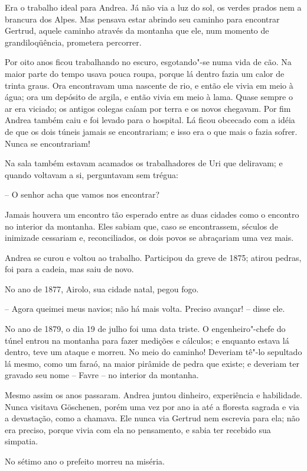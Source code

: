 Era o trabalho ideal para Andrea. Já não via a luz do sol, os verdes
prados nem a brancura dos Alpes. Mas pensava estar abrindo seu caminho
para encontrar Gertrud, aquele caminho através da montanha que ele, num
momento de grandiloqüência, prometera percorrer.

Por oito anos ficou trabalhando no escuro, esgotando"-se numa vida de
cão. Na maior parte do tempo usava pouca roupa, porque lá dentro fazia
um calor de trinta graus. Ora encontravam uma nascente de rio, e então
ele vivia em meio à água; ora um depósito de argila, e então vivia em
meio à lama. Quase sempre o ar era viciado; os antigos colegas caíam
por terra e os novos chegavam. Por fim Andrea também caiu e foi levado
para o hospital. Lá ficou obcecado com a idéia de que os dois túneis
jamais se encontrariam; e isso era o que mais o fazia sofrer. Nunca se
encontrariam!

Na sala também estavam acamados os trabalhadores de Uri que deliravam; e
quando voltavam a si, perguntavam sem trégua:

-- O senhor acha que vamos nos encontrar?

Jamais houvera um encontro tão esperado entre as duas cidades como o
encontro no interior da montanha. Eles sabiam que, caso se
encontrassem, séculos de inimizade cessariam e, reconciliados, os dois
povos se abraçariam uma vez mais.

Andrea se curou e voltou ao trabalho. Participou da greve de 1875;
atirou pedras, foi para a cadeia, mas saiu de novo.

No ano de 1877, Airolo, sua cidade natal, pegou fogo.

-- Agora queimei meus navios; não há mais volta. Preciso avançar! -- disse
ele.

No ano de 1879, o dia 19 de julho foi uma data triste. O
engenheiro"-chefe do túnel entrou na montanha para fazer medições e
cálculos; e enquanto estava lá dentro, teve um ataque e morreu. 
No meio do caminho! Deveriam tê"-lo sepultado lá mesmo, como
um faraó, na maior pirâmide de pedra que existe; e deveriam ter gravado
seu nome -- Favre -- no interior da montanha.

Mesmo assim os anos passaram. Andrea juntou dinheiro, experiência e
habilidade. Nunca visitava Göschenen, porém uma vez por ano ia até a
floresta sagrada e via a devastação, como a chamava. Ele nunca via
Gertrud nem escrevia para ela; não era preciso, porque vivia com ela no
pensamento, e sabia ter recebido sua simpatia.

No sétimo ano o prefeito morreu na miséria.

